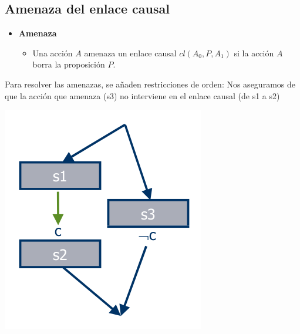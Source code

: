 \documentclass[11pt]{article}
\begin{document}
\subsection*{Amenaza del enlace causal}
\label{sec:orgc61948e}
\begin{itemize}
\item \textbf{{\color{green}Amenaza}}
\begin{itemize}
\item Una acción \(A\)  {\color{red}amenaza} un enlace causal
\(cl(A_0,P,A_1)\) si la acción \(A\) borra la proposición \(P\).
\end{itemize}
\end{itemize}

Para resolver las amenazas,
se añaden restricciones de orden:
Nos aseguramos de que la acción
que amenaza (s3) no interviene
en el enlace causal (de s1 a s2)


\begin{center}
\includegraphics[width=.9\linewidth]{imagenes/amenazaCausal.png}
\end{center}
\end{document}
